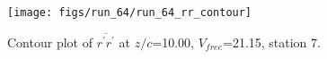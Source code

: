 \begin{figure}[H]
\centering
\texttt{[image: figs/run\_64/run\_64\_rr\_contour]}
\caption{Contour plot of $\overline{r^\prime r^\prime}$ at $z/c$=10.00, $V_{free}$=21.15, station 7.}
\end{figure}


